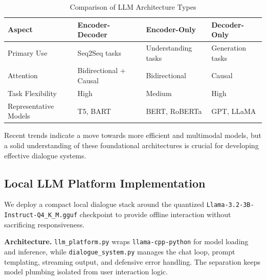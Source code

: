 \documentclass[12pt,a4paper]{article}
\begin{document}
\begin{table}[H]
\centering
\caption{Comparison of LLM Architecture Types}
\label{tab:llm_comparison}
\begin{tabular}{|l|l|l|l|}
\hline
\textbf{Aspect} & \textbf{Encoder-Decoder} & \textbf{Encoder-Only} & \textbf{Decoder-Only} \\
\hline
Primary Use & Seq2Seq tasks & Understanding tasks & Generation tasks \\
\hline
Attention & Bidirectional + Causal & Bidirectional & Causal \\
\hline
Task Flexibility & High & Medium & High \\
\hline
Representative Models & T5, BART & BERT, RoBERTa & GPT, LLaMA \\
\hline
\end{tabular}
\end{table}

Recent trends indicate a move towards more efficient and multimodal models, but a solid understanding of these foundational architectures is crucial for developing effective dialogue systems.





\subsection{Local LLM Platform Implementation}

We deploy a compact local dialogue stack around the quantized \texttt{Llama-3.2-3B-Instruct-Q4\_K\_M.gguf} checkpoint to provide offline interaction without sacrificing responsiveness.

\noindent\textbf{Architecture.} \texttt{llm\_platform.py} wraps \texttt{llama-cpp-python} for model loading and inference, while \texttt{dialogue\_system.py} manages the chat loop, prompt templating, streaming output, and defensive error handling. The separation keeps model plumbing isolated from user interaction logic.
\end{document}
